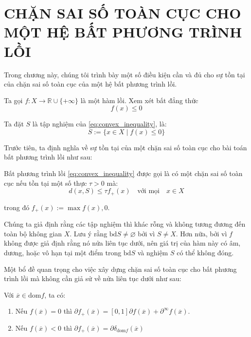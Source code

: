 \chapter{CHẶN SAI SỐ TOÀN CỤC CHO MỘT HỆ BẤT PHƯƠNG TRÌNH LỒI}

Trong chương này, chúng tôi trình bày một số điều kiện cần và đủ cho sự tồn tại của chặn sai số toàn cục của một hệ bất phương trình lồi. 

Ta gọi $f: X \rightarrow \mathbb{R} \cup \{+\infty\}$ là một hàm lồi. Xem xét bất đẳng thức
\begin{equation}
    \label{eq:convex_inequality}
    f(x) \leq 0
\end{equation}

Ta đặt $S$ là tập nghiệm của \eqref{eq:convex_inequality}, là:
\begin{equation}
    S := \{x \in X \mid f(x) \leq 0\}
\end{equation}

Trước tiên, ta định nghĩa về sự tồn tại của một chặn sai số toàn cục cho bài toán bất phương trình lồi như sau:
\begin{defi}
    Bất phương trình lồi \eqref{eq:convex_inequality} được gọi là có một chặn sai số toàn cục nếu tồn tại một số thực $\tau > 0$ mà:
    \begin{equation}
        d(x, S) \leq \tau f_{+}(x) \quad\text{với mọi}\quad x \in X
    \end{equation}
\end{defi}
trong đó $f_{+}(x) := \max{f(x), 0}$.

Chúng ta giả định rằng các tập nghiệm thì khác rỗng và không tương đương đến toàn bộ không gian $X$. Lưu ý rằng $\text{bd} S \ne \varnothing$ bởi vì $S \ne X$. Hơn nữa, bởi vì $f$ không được giả định rằng nó nửa liên tục dưới, nên giá trị của hàm này có âm, dương, hoặc vô hạn tại một điểm trong $\text{bd} S$ và nghiệm $S$ có thể không đóng.

Một bổ đề quan trọng cho việc xây dựng chặn sai số toàn cục cho bất phương trình lồi mà không cần giả sử về nửa liên tục dưới như sau:
\begin{lemma}
    Với $\overline{x} \in \text{dom} f$, ta có:
    \begin{enumerate}[label=(\roman*)]
        \item Nếu $f(\overline{x}) = 0$ thì $\partial f_{+}(\overline{x}) = [0, 1]\partial f(\overline{x}) + \partial^{\infty} f(\overline{x})$.
        \item Nếu $f(\overline{x}) < 0$ thì $\partial f_{+}(\overline{x}) = \partial \delta_{\text{dom}f}(\overline{x})$
    \end{enumerate}
\end{lemma}

